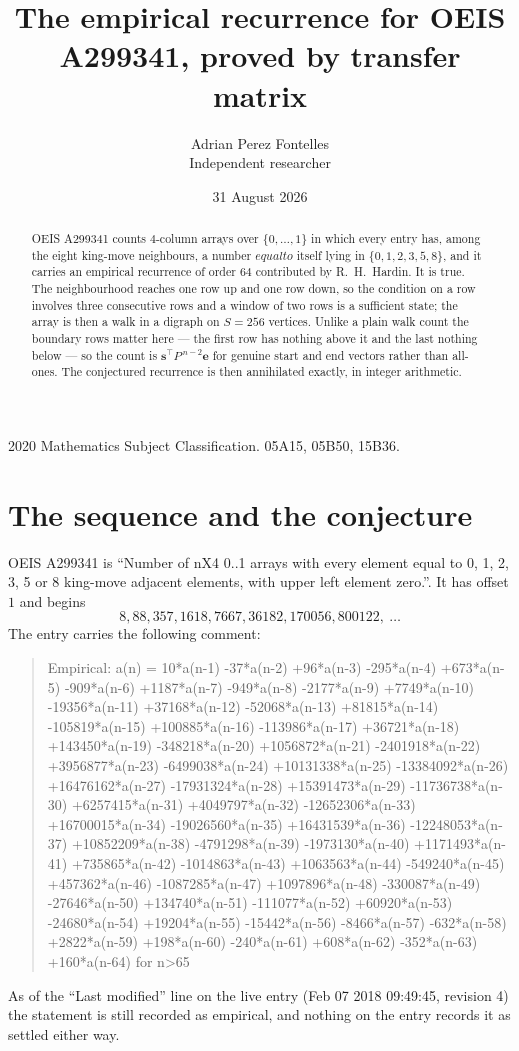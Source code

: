 \documentclass[11pt,a4paper]{article}
\title{The empirical recurrence for OEIS A299341, proved by transfer matrix}
\author{Adrian Perez Fontelles\\ \small Independent researcher}
\date{31 August 2026}
\theoremstyle{plain}
\theoremstyle{definition}
\begin{document}
\maketitle

\begin{abstract}
OEIS A299341 counts $4$-column arrays over $\{0,\dots,1\}$ in which every entry has,
among the eight king-move neighbours, a number $equal to$ itself lying in $\{0,1,2,3,5,8\}$, and it carries an empirical
recurrence of order $64$ contributed by R.~H.~Hardin. It is true. The neighbourhood
reaches one row up and one row down, so the condition on a row involves three consecutive
rows and a window of two rows is a sufficient state; the array is then a walk in a digraph
on $S=256$ vertices. Unlike a plain walk count the boundary rows matter here --- the first
row has nothing above it and the last nothing below --- so the count is
$\mathbf{s}^{\!\top}P^{\,n-2}\mathbf{e}$ for genuine start and end vectors rather than
all-ones. The conjectured recurrence is then annihilated exactly, in integer arithmetic.
\end{abstract}

\noindent\small 2020 Mathematics Subject Classification. 05A15, 05B50, 15B36.\normalsize

\section{The sequence and the conjecture}

OEIS A299341 is ``Number of nX4 0..1 arrays with every element equal to 0, 1, 2, 3, 5 or 8 king-move adjacent elements, with upper left element zero.''. It has offset
$1$ and begins
\[
8, 88, 357, 1618, 7667, 36182, 170056, 800122,\ \dots
\]
The entry carries the following comment:
\begin{quote}\small
Empirical: a(n) = 10*a(n-1) -37*a(n-2) +96*a(n-3) -295*a(n-4) +673*a(n-5) -909*a(n-6) +1187*a(n-7) -949*a(n-8) -2177*a(n-9) +7749*a(n-10) -19356*a(n-11) +37168*a(n-12) -52068*a(n-13) +81815*a(n-14) -105819*a(n-15) +100885*a(n-16) -113986*a(n-17) +36721*a(n-18) +143450*a(n-19) -348218*a(n-20) +1056872*a(n-21) -2401918*a(n-22) +3956877*a(n-23) -6499038*a(n-24) +10131338*a(n-25) -13384092*a(n-26) +16476162*a(n-27) -17931324*a(n-28) +15391473*a(n-29) -11736738*a(n-30) +6257415*a(n-31) +4049797*a(n-32) -12652306*a(n-33) +16700015*a(n-34) -19026560*a(n-35) +16431539*a(n-36) -12248053*a(n-37) +10852209*a(n-38) -4791298*a(n-39) -1973130*a(n-40) +1171493*a(n-41) +735865*a(n-42) -1014863*a(n-43) +1063563*a(n-44) -549240*a(n-45) +457362*a(n-46) -1087285*a(n-47) +1097896*a(n-48) -330087*a(n-49) -27646*a(n-50) +134740*a(n-51) -111077*a(n-52) +60920*a(n-53) -24680*a(n-54) +19204*a(n-55) -15442*a(n-56) -8466*a(n-57) -632*a(n-58) +2822*a(n-59) +198*a(n-60) -240*a(n-61) +608*a(n-62) -352*a(n-63) +160*a(n-64) for n>65
\end{quote}
As of the ``Last modified'' line on the live entry (Feb 07 2018 09:49:45, revision
4) the statement is still recorded as empirical, and nothing on the entry
records it as settled either way.
\end{document}
